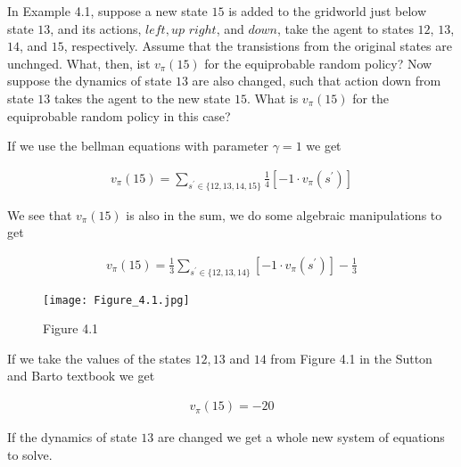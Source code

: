 \begin{exercise}
In Example 4.1, suppose a new state $15$ is added to the gridworld just below state $13$, and its actions, $\mathit{left}, \mathit{up}$ $\mathit{right}$, and $\mathit{down}$, take the agent to states $12$, $13$, $14$, and $15$, respectively.
Assume that the transistions from the original states are unchnged.
What, then, ist $v_\pi(15)$ for the equiprobable random policy?
Now suppose the dynamics of state $13$ are also changed, such that action down from state $13$ takes the agent to the new state $15$.
What is $v_\pi(15)$ for the equiprobable random policy in this case?
\end{exercise}

\begin{solution}
If we use the bellman equations with parameter $\gamma = 1$ we get

\begin{align*}
  v_\pi(15)
  =
  \sum_{s^\prime \in \{12,13,14,15\}}\frac{1}{4}[-1 \cdot v_\pi(s^\prime)]
\end{align*}

We see that $v_\pi(15)$ is also in the sum, we do some algebraic manipulations to get

\begin{align*}
  v_\pi(15)
  =
  \frac{1}{3} \sum_{s^\prime \in \{12,13,14\}}[-1 \cdot v_\pi(s^\prime)] - \frac{1}{3}
\end{align*}

\begin{figure}[H]
  \centering
  \texttt{[image: Figure\_4.1.jpg]}
  \caption{Figure 4.1}
\end{figure}

If we take the values of the states $12,13$ and $14$ from Figure 4.1 in the Sutton and Barto textbook we get

\begin{align*}
  v_\pi(15)
  =
  -20
\end{align*}

If the dynamics of state $13$ are changed we get a whole new system of equations to solve.
\end{solution}
